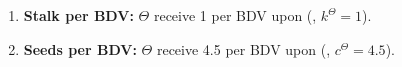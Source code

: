 \documentclass[class=article, crop=false]{standalone}
\begin{document}
\begin{enumerate}
    \item \textbf{Stalk per BDV:} $\Theta$  receive 1  per BDV upon  (, $k^{\Theta} = 1$).
    
    \item \textbf{Seeds per BDV:} $\Theta$  receive 4.5  per BDV upon  (, $c^{\Theta} = 4.5$).
\end{enumerate}
\end{document}
